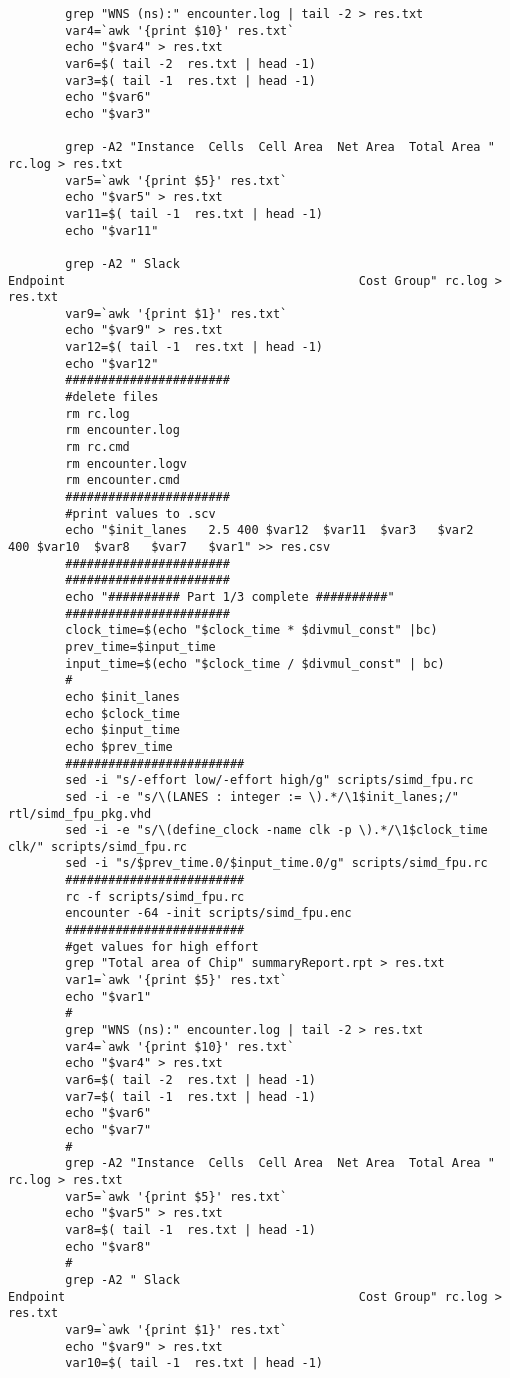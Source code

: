 \documentclass[conference]{IEEEtran}
\begin{document}
\begin{lstlisting}
		grep "WNS (ns):" encounter.log | tail -2 > res.txt
		var4=`awk '{print $10}' res.txt`
		echo "$var4" > res.txt
		var6=$( tail -2  res.txt | head -1)
		var3=$( tail -1  res.txt | head -1)
		echo "$var6"
		echo "$var3"
		
		grep -A2 "Instance  Cells  Cell Area  Net Area  Total Area " rc.log > res.txt
		var5=`awk '{print $5}' res.txt`
		echo "$var5" > res.txt
		var11=$( tail -1  res.txt | head -1)
		echo "$var11"
		
		grep -A2 " Slack                                          Endpoint                                         Cost Group" rc.log > res.txt
		var9=`awk '{print $1}' res.txt`
		echo "$var9" > res.txt
		var12=$( tail -1  res.txt | head -1)
		echo "$var12"	
		#######################
		#delete files
		rm rc.log
		rm encounter.log
		rm rc.cmd
		rm encounter.logv
		rm encounter.cmd
		#######################
		#print values to .scv
		echo "$init_lanes	2.5	400	$var12	$var11	$var3	$var2	400	$var10	$var8	$var7	$var1" >> res.csv
		#######################
		#######################
		echo "########## Part 1/3 complete ##########"
		#######################
		clock_time=$(echo "$clock_time * $divmul_const" |bc)
		prev_time=$input_time
		input_time=$(echo "$clock_time / $divmul_const" | bc)
		#
		echo $init_lanes
		echo $clock_time
		echo $input_time
		echo $prev_time
		#########################
		sed -i "s/-effort low/-effort high/g" scripts/simd_fpu.rc
		sed -i -e "s/\(LANES : integer := \).*/\1$init_lanes;/" rtl/simd_fpu_pkg.vhd
		sed -i -e "s/\(define_clock -name clk -p \).*/\1$clock_time clk/" scripts/simd_fpu.rc
		sed -i "s/$prev_time.0/$input_time.0/g" scripts/simd_fpu.rc
		#########################
		rc -f scripts/simd_fpu.rc
		encounter -64 -init scripts/simd_fpu.enc
		#########################
		#get values for high effort
		grep "Total area of Chip" summaryReport.rpt > res.txt
		var1=`awk '{print $5}' res.txt`
		echo "$var1"
		#
		grep "WNS (ns):" encounter.log | tail -2 > res.txt
		var4=`awk '{print $10}' res.txt`
		echo "$var4" > res.txt
		var6=$( tail -2  res.txt | head -1)
		var7=$( tail -1  res.txt | head -1)
		echo "$var6"
		echo "$var7"
		#
		grep -A2 "Instance  Cells  Cell Area  Net Area  Total Area " rc.log > res.txt
		var5=`awk '{print $5}' res.txt`
		echo "$var5" > res.txt
		var8=$( tail -1  res.txt | head -1)
		echo "$var8"
		#
		grep -A2 " Slack                                          Endpoint                                         Cost Group" rc.log > res.txt
		var9=`awk '{print $1}' res.txt`
		echo "$var9" > res.txt
		var10=$( tail -1  res.txt | head -1)

\end{lstlisting}
\end{document}
